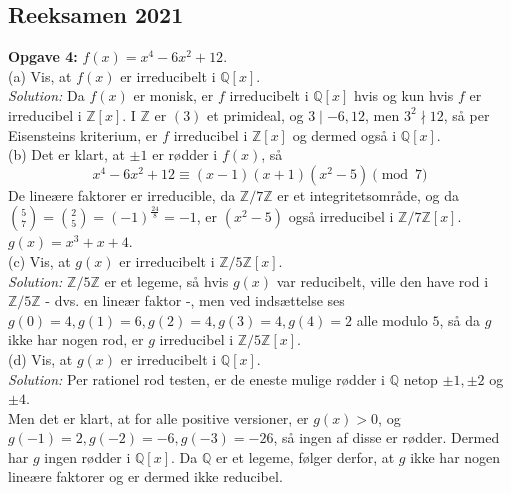 \documentclass[a4paper]{article}
\begin{document}
\subsection{Reeksamen 2021}

\textbf{Opgave 4:} $f(x) = x^{4} - 6x^2 +12$.\\
\linebreak
(a) Vis, at $f(x)$ er irreducibelt i $\mathbb{Q}[x]$.\\
\linebreak
\textit{Solution:} Da $f(x)$ er monisk, er $f$ irreducibelt i $\mathbb{Q}[x]$
hvis og kun hvis $f$ er irreducibel i $\mathbb{Z}[x]$. I $\mathbb{Z}$ er $(3)$
et primideal, og $3 \mid -6, 12$, men $3^2 \nmid 12$, så per Eisensteins
kriterium, er $f$ irreducibel i $\mathbb{Z}[x]$ og dermed også
i $\mathbb{Q}[x]$.\\
\linebreak
(b) Det er klart, at $\pm 1$ er rødder i $f(x)$, så
\[
    x^{4} - 6x^2 + 12 \equiv (x-1)(x+1) (x^2 -5) \pmod{7}
\] 
De lineære faktorer er irreducible, da $\mathbb{Z}/7\mathbb{Z}$ er et
integritetsområde, og da $\binom{5}{7} = \binom{2}{5} = (-1)^{\frac{24}{8}}
= -1$, er $(x^2 -5)$ også irreducibel i $\mathbb{Z}/7\mathbb{Z}[x]$.\\
\linebreak
$g(x) = x^3 + x + 4$.\\
(c) Vis, at $g(x)$ er irreducibelt i $\mathbb{Z}/5\mathbb{Z}[x]$.\\
\linebreak
\textit{Solution:} $\mathbb{Z}/5\mathbb{Z}$ er et legeme, så hvis $g(x)$ var
reducibelt, ville den have rod i $\mathbb{Z}/5\mathbb{Z}$ - dvs. en lineær
faktor -, men ved indsættelse ses
$g(0)=4, g(1) = 6, g(2) = 4, g(3) = 4, g(4) = 2$ alle modulo $5$, så  da $g$
ikke har nogen rod, er $g$ irreducibel i $\mathbb{Z}/5\mathbb{Z} [x]$.\\
\linebreak
(d) Vis, at $g(x)$ er irreducibelt i $\mathbb{Q}[x]$.\\
\linebreak
\textit{Solution:} Per rationel rod testen, er de eneste mulige rødder
i $\mathbb{Q}$ netop $\pm 1, \pm 2$ og $\pm 4$.\\
Men det er klart, at for alle positive versioner, er $g(x)>0$, og $g(-1) = 2,
g(-2)= -6, g(-3) = -26$, så ingen af disse er rødder. Dermed har $g$ ingen
rødder i $\mathbb{Q}[x]$. Da $\mathbb{Q}$ er et legeme, følger derfor, at $g$
ikke har nogen lineære faktorer og er dermed ikke reducibel.
\end{document}
